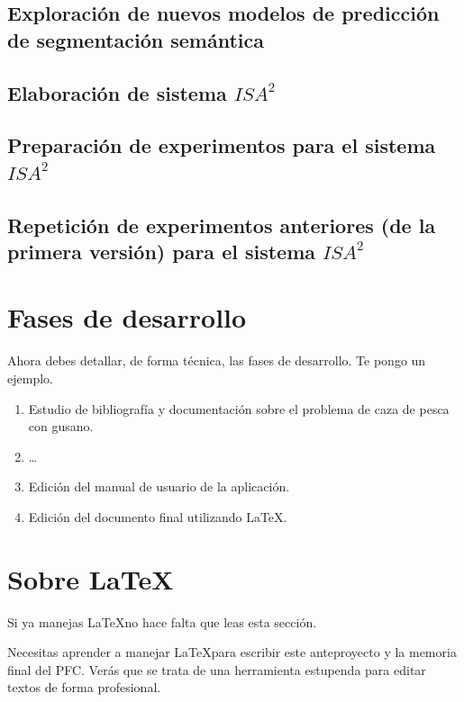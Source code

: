 \documentclass[12pt,oneside,a4paper]{article}
\begin{document}
\subsection{Exploración de nuevos modelos de predicción de segmentación semántica}

\subsection{Elaboración de sistema $ISA^2$}

\subsection{Preparación de experimentos para el sistema $ISA^2$}

\subsection{Repetición de experimentos anteriores (de la primera versión) para el sistema $ISA^2$}


\section{Fases de desarrollo}
Ahora debes detallar, de forma técnica, las fases de desarrollo. Te pongo un ejemplo.

\begin{enumerate}
\item Estudio de bibliografía y documentación sobre el problema de caza de pesca con gusano.
\item \ldots
\item Edición del manual de usuario de la aplicación.
\item Edición del documento final utilizando \LaTeX.
\end{enumerate}

\section{Sobre \LaTeX}

Si ya manejas \LaTeX no hace falta que leas esta sección.

Necesitas aprender a manejar \LaTeX para escribir este anteproyecto y la memoria final del PFC. Verás que se trata de una herramienta estupenda para editar textos de forma profesional.
\end{document}
